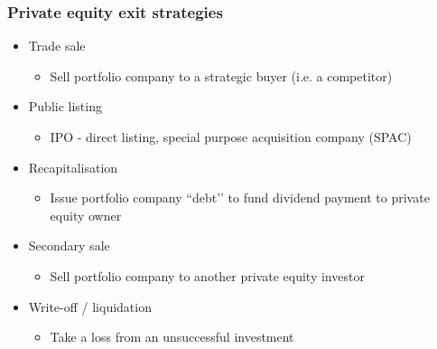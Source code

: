 \documentclass[../notes_compiled.tex]{subfiles}
\begin{document}
\subsubsection{Private equity exit strategies}
\begin{itemize}
\item Trade sale
\begin{itemize}
\item Sell portfolio company to a strategic buyer (i.e. a competitor)
\end{itemize}
\item Public listing
\begin{itemize}
\item IPO - direct listing, special purpose acquisition company (SPAC)
\end{itemize}
\item Recapitalisation
\begin{itemize}
\item Issue portfolio company ``debt’’ to fund dividend payment to private equity owner
\end{itemize}
\item Secondary sale
\begin{itemize}
\item Sell portfolio company to another private equity investor
\end{itemize}
\item Write-off / liquidation
\begin{itemize}
\item Take a loss from an unsuccessful investment
\end{itemize}
\end{itemize}
\end{document}
